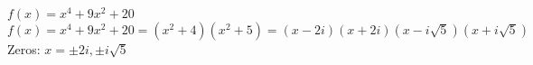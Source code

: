 {$f(x) = x^4+9x^2+20$}
{$f(x) = x^4+9x^2+20 = \left(x^2+4\right) \left(x^2+5\right) = (x-2i)(x+2i)\left(x - i \sqrt{5}\right)\left(x + i \sqrt{5}\right)$\\
Zeros:  $x = \pm 2i, \pm i \sqrt{5}$}